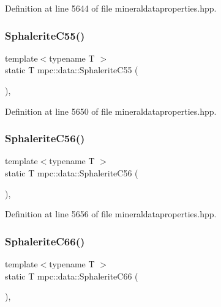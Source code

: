 Definition at line 5644 of file mineraldataproperties.\+hpp.

\mbox{\label{namespacempc_1_1data_ace22e6ee016aab76fc5184a359b05a8c}} 
\subsubsection{\texorpdfstring{Sphalerite\+C55()}{SphaleriteC55()}}
{\footnotesize\ttfamily template$<$typename T $>$ \\
static T mpc\+::data\+::\+Sphalerite\+C55 (\begin{DoxyParamCaption}{ }\end{DoxyParamCaption})\hspace{0.3cm}{\ttfamily [inline]}, {\ttfamily [static]}}



Definition at line 5650 of file mineraldataproperties.\+hpp.

\mbox{\label{namespacempc_1_1data_a149e70c81b641a4563565734f1357853}} 
\subsubsection{\texorpdfstring{Sphalerite\+C56()}{SphaleriteC56()}}
{\footnotesize\ttfamily template$<$typename T $>$ \\
static T mpc\+::data\+::\+Sphalerite\+C56 (\begin{DoxyParamCaption}{ }\end{DoxyParamCaption})\hspace{0.3cm}{\ttfamily [inline]}, {\ttfamily [static]}}



Definition at line 5656 of file mineraldataproperties.\+hpp.

\mbox{\label{namespacempc_1_1data_a25daa9935311ad2e177dec08163c2fda}} 
\subsubsection{\texorpdfstring{Sphalerite\+C66()}{SphaleriteC66()}}
{\footnotesize\ttfamily template$<$typename T $>$ \\
static T mpc\+::data\+::\+Sphalerite\+C66 (\begin{DoxyParamCaption}{ }\end{DoxyParamCaption})\hspace{0.3cm}{\ttfamily [inline]}, {\ttfamily [static]}}



